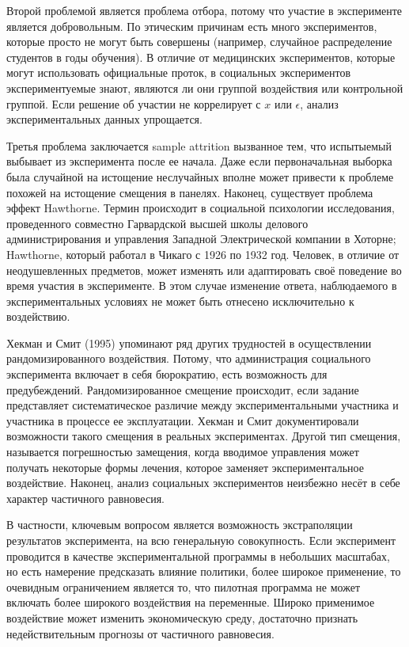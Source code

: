 Второй проблемой является проблема отбора, потому что участие в эксперименте является добровольным. По этическим причинам есть много экспериментов, которые просто не могут быть совершены (например, случайное распределение студентов в годы обучения). В отличие от медицинских экспериментов, которые могут использовать официальные проток, в социальных экспериментов экспериментуемые знают, являются ли они группой воздействия или контрольной группой. Если решение об участии не коррелирует с $x$ или $\epsilon$, анализ экспериментальных данных упрощается.


Третья проблема заключается sample attrition вызванное тем, что испытыемый выбывает из эксперимента после ее начала. Даже если первоначальная выборка была случайной на истощение неслучайных вполне может привести к проблеме похожей на истощение смещения в панелях. Наконец, существует проблема эффект Hawthorne. Термин происходит в социальной психологии исследования, проведенного совместно Гарвардской высшей школы делового администрирования и управления Западной Электрической компании в Хоторне; Hawthorne, который работал в Чикаго с 1926 по 1932 год. Человек, в отличие от неодушевленных предметов, может изменять или адаптировать своё поведение во время участия в эксперименте. В этом случае изменение ответа, наблюдаемого в экспериментальных условиях не может быть отнесено исключительно к воздействию.


Хекман и Смит (1995) упоминают ряд других трудностей в осуществлении рандомизированного воздействия. Потому, что администрация социального эксперимента включает в себя бюрократию, есть возможность для предубеждений. Рандомизированное смещение происходит, если задание представляет систематическое различие между экспериментальными участника и участника в процессе ее эксплуатации. Хекман и Смит документировали возможности такого смещения в реальных экспериментах. Другой тип смещения, называется погрешностью замещения, когда вводимое управления может получать некоторые формы лечения, которое заменяет экспериментальное воздействие. Наконец, анализ социальных экспериментов неизбежно несёт в себе характер частичного равновесия. 


В частности, ключевым вопросом является возможность экстраполяции результатов эксперимента, на всю генеральную совокупность. Если эксперимент проводится в качестве экспериментальной программы в небольших масштабах, но есть намерение предсказать влияние политики, более широкое применение, то очевидным ограничением является то, что пилотная программа не может включать более широкого воздействия на переменные. Широко применимое воздействие может изменить экономическую среду, достаточно признать недействительным прогнозы от частичного равновесия. 


